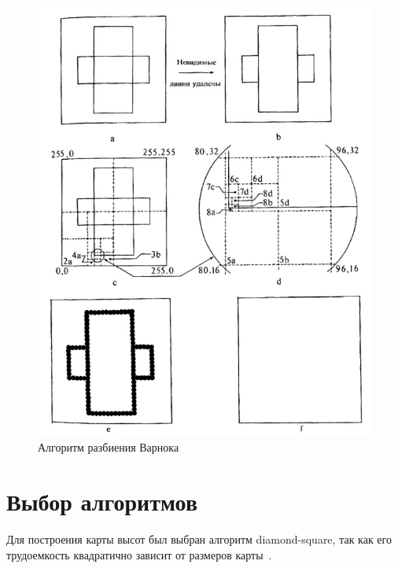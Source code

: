 \documentclass[a4paper, 14pt]{extreport}
\begin{document}
\begin{figure}[h]
	\centering
	\includegraphics[scale=0.8]{tools/varnok.png}
	\caption{Алгоритм разбиения Варнока}
	\label{analytic:varnok}
\end{figure}

\section{Выбор алгоритмов}

Для построения карты высот был выбран алгоритм diamond-square, так как его трудоемкость квадратично зависит от
размеров карты~\cite{fractal}.
\end{document}
